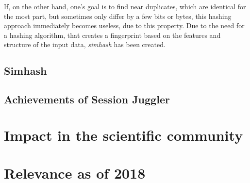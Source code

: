 \documentclass[12pt,twocolumn,a4paper,DIV=calc]{scrartcl}
\begin{document}
If, on the other hand, one's goal is to find near duplicates, which are identical for the most part, but sometimes only differ by a few bits or bytes, this hashing approach immediately becomes useless, due to this property.
Due to the need for a hashing algorithm, that creates a fingerprint based on the features and structure of the input data, \emph{simhash} has been created.


\subsection{Simhash}

\cite{inproc:simhash}

\subsection{}



\subsection{Achievements of Session Juggler}


\section{Impact in the scientific community}


\section{Relevance as of 2018}


\printbibliography
\end{document}
